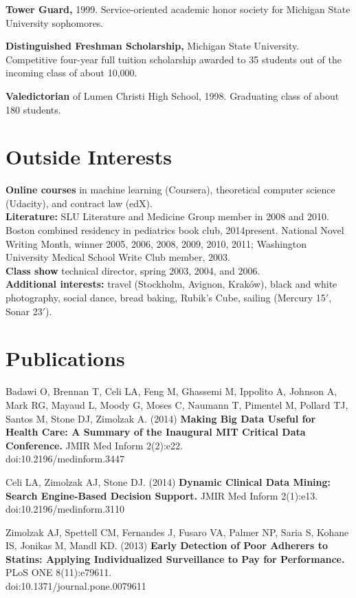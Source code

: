 \documentclass[12pt]{article}
\begin{document}
\textbf{Tower Guard,} 1999. Service-oriented academic honor
society for Michigan State University sophomores.

\textbf{Distinguished Freshman Scholarship,} Michigan State
University. Competitive four-year full tuition scholarship awarded to
35 students out of the incoming class of about 10,000.

\textbf{Valedictorian} of Lumen Christi High School, 1998. Graduating
class of about 180 students.

\section*{Outside Interests}

\textbf{Online courses} in machine learning (Coursera), theoretical
computer science (Udacity), and contract law (edX).\\
\textbf{Literature:} SLU Literature and Medicine Group member in
2008 and 2010. Boston combined residency in pediatrics book club,
2014\ndash{}present. National Novel Writing Month, winner 2005, 2006,
2008, 2009, 2010, 2011; Washington University Medical School Write Club
member, 2003.\\
\textbf{Class show} technical director, spring 2003, 2004, and 2006.\\
\textbf{Additional interests:} travel (Stockholm, Avignon, Krak\'ow),
black and white photography, social dance, bread baking, Rubik’s Cube,
sailing (Mercury 15$'$, Sonar 23$'$).

\section*{Publications}
Badawi O, Brennan T, Celi LA, Feng M, Ghassemi M, Ippolito A, Johnson
A, Mark RG, Mayaud L, Moody G, Moses C, Naumann T, Pimentel M, Pollard
TJ, Santos M, Stone DJ, Zimolzak A. (2014) \textbf{Making Big Data
  Useful for Health Care: A Summary of the Inaugural MIT Critical Data
  Conference.} JMIR Med Inform 2(2):e22.\\
doi:10.2196/medinform.3447

Celi LA, Zimolzak AJ, Stone DJ. (2014) \textbf{Dynamic Clinical Data
  Mining: Search Engine-Based Decision Support.} JMIR Med Inform
2(1):e13. doi:10.2196/medinform.3110

Zimolzak AJ, Spettell CM, Fernandes J, Fusaro VA, Palmer NP, Saria S,
Kohane IS, Jonikas M, Mandl KD. (2013) \textbf{Early Detection of Poor
  Adherers to Statins: Applying Individualized Surveillance to Pay for
  Performance.} PLoS ONE 8(11):e79611. \\
doi:10.1371/journal.pone.0079611
\end{document}
